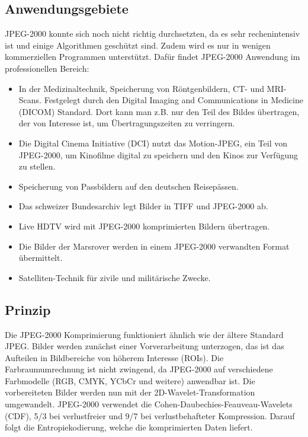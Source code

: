 \subsection{Anwendungsgebiete
\label{jpeg:subsection:anwendungsgebiete}}
JPEG-2000 konnte sich noch nicht richtig durchsetzten, da es sehr rechenintensiv ist und einige Algorithmen geschützt sind.
Zudem wird es nur in wenigen kommerziellen Programmen unterstützt.
Dafür findet JPEG-2000 Anwendung im professionellen Bereich:
\begin{itemize}
    \item In der Medizinaltechnik, Speicherung von Röntgenbildern, CT- und MRI-Scans.
    Festgelegt durch den Digital Imaging and Communications in Medicine (DICOM) Standard.
%
%
    Dort kann man z.B. nur den Teil des Bildes übertragen, der von Interesse ist, um Übertragungszeiten zu verringern.
    \item Die Digital Cinema Initiative (DCI) nutzt das Motion-JPEG, ein Teil von JPEG-2000, um Kinofilme digital zu speichern und den Kinos zur Verfügung zu stellen.
%
%
    \item Speicherung von Passbildern auf den deutschen Reisepässen.
    \item Das schweizer Bundesarchiv legt Bilder in TIFF und JPEG-2000 ab.
%
    \item Live HDTV wird mit JPEG-2000 komprimierten Bildern übertragen.
%
    \item Die Bilder der Marsrover werden in einem JPEG-2000 verwandten Format übermittelt.
%
    \item Satelliten-Technik für zivile und militärische Zwecke.   
\end{itemize}


\subsection{Prinzip
\label{jpeg:subsection:prinzip}}
Die JPEG-2000 Komprimierung funktioniert ähnlich wie der ältere Standard JPEG.
Bilder werden zunächst einer Vorverarbeitung unterzogen, das ist das Aufteilen in Bildbereiche von höherem Interesse (ROIs).
Die Farbraumumrechnung ist nicht zwingend, da JPEG-2000 auf verschiedene Farbmodelle (RGB, CMYK, YCbCr und weitere) anwendbar ist.
%
%
%
Die vorbereiteten Bilder werden nun mit der 2D-Wavelet-Transformation umgewandelt.
JPEG-2000 verwendet die Cohen-Daubechies-Feauveau-Wavelets (CDF), 5/3 bei verlustfreier und 9/7 bei verlustbehafteter Kompression.
%
%
Darauf folgt die Entropiekodierung, welche die komprimierten Daten liefert. 

